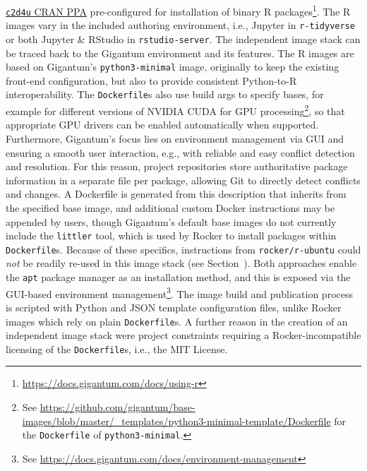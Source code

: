 \begin{itemize}
  \href{https://launchpad.net/~marutter/+archive/ubuntu/c2d4u3.5/}{\texttt{c2d4u}
  CRAN PPA} pre-configured for installation of binary R
  packages\footnote{\href{https://docs.gigantum.com/docs/using-r}{https://docs.gigantum.com/docs/using-r}}.
  The R images vary in the included authoring environment, i.e., Jupyter
  in \texttt{r-tidyverse} or both Jupyter \& RStudio in
  \texttt{rstudio-server}. The independent image stack can be traced
  back to the Gigantum environment and its features. The R images are
  based on Gigantum's \texttt{python3-minimal} image, originally to keep
  the existing front-end configuration, but also to provide consistent
  Python-to-R interoperability. The \texttt{Dockerfile}s also use build
  args to specify bases, for example for different versions of NVIDIA
  CUDA for GPU
  processing\footnote{See \href{https://github.com/gigantum/base-images/blob/master/_templates/python3-minimal-template/Dockerfile}{https://github.com/gigantum/base-images/blob/master/\_templates/python3-minimal-template/Dockerfile} for the \texttt{Dockerfile} of \texttt{python3-minimal}.},
  so that appropriate GPU drivers can be enabled automatically when
  supported. Furthermore, Gigantum's focus lies on environment
  management via GUI and ensuring a smooth user interaction, e.g., with
  reliable and easy conflict detection and resolution. For this reason,
  project repositories store authoritative package information in a
  separate file per package, allowing Git to directly detect conflicts
  and changes. A Dockerfile is generated from this description that
  inherits from the specified base image, and additional custom Docker
  instructions may be appended by users, though Gigantum's default base
  images do not currently include the \texttt{littler} tool, which is
  used by Rocker to install packages within \texttt{Dockerfile}s.
  Because of these specifics, instructions from \texttt{rocker/r-ubuntu}
  could \emph{not} be readily re-used in this image stack (see
  Section~). Both approaches enable the
  \texttt{apt} package manager \citep{wikipedia_contributors_apt_2020}
  as an installation method, and this is exposed via the GUI-based
  environment
  management\footnote{See \href{https://docs.gigantum.com/docs/environment-management}{https://docs.gigantum.com/docs/environment-management}}.
  The image build and publication process is scripted with Python and
  JSON template configuration files, unlike Rocker images which rely on
  plain \texttt{Dockerfile}s. A further reason in the creation of an
  independent image stack were project constraints requiring a
  Rocker-incompatible licensing of the \texttt{Dockerfile}s, i.e., the
  MIT License.
\end{itemize}

